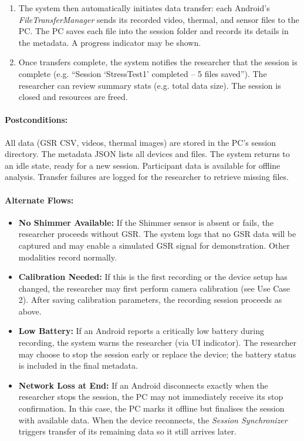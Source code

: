\begin{enumerate}
    \item The system then automatically initiates data transfer: each Android’s \textit{FileTransferManager} sends its recorded video, thermal, and sensor files to the PC. The PC saves each file into the session folder and records its details in the metadata. A progress indicator may be shown.
    \item Once transfers complete, the system notifies the researcher that the session is complete (e.g. “Session ‘StressTest1’ completed – 5 files saved”). The researcher can review summary stats (e.g. total data size). The session is closed and resources are freed.
\end{enumerate}
\paragraph{Postconditions:} All data (GSR CSV, videos, thermal images) are stored in the PC's session directory. The metadata JSON lists all devices and files. The system returns to an idle state, ready for a new session. Participant data is available for offline analysis. Transfer failures are logged for the researcher to retrieve missing files.
\paragraph{Alternate Flows:}
\begin{itemize}
    \item \textbf{No Shimmer Available:} If the Shimmer sensor is absent or fails, the researcher proceeds without GSR. The system logs that no GSR data will be captured and may enable a simulated GSR signal for demonstration. Other modalities record normally.
    \item \textbf{Calibration Needed:} If this is the first recording or the device setup has changed, the researcher may first perform camera calibration (see Use Case 2). After saving calibration parameters, the recording session proceeds as above.
    \item \textbf{Low Battery:} If an Android reports a critically low battery during recording, the system warns the researcher (via UI indicator). The researcher may choose to stop the session early or replace the device; the battery status is included in the final metadata.
    \item \textbf{Network Loss at End:} If an Android disconnects exactly when the researcher stops the session, the PC may not immediately receive its stop confirmation. In this case, the PC marks it offline but finalises the session with available data. When the device reconnects, the \textit{Session Synchronizer} triggers transfer of its remaining data so it still arrives later.
\end{itemize}

